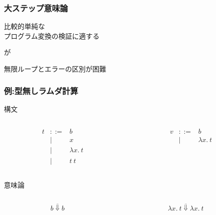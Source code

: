 \documentclass[dvipdfmx,cjk,xcolor=dvipsnames,envcountsect,notheorems,12pt]{beamer}
\theoremstyle{definition}
\begin{document}
\begin{frame}
	\frametitle{大ステップ意味論}
	\LARGE
	\begin{center}
	比較的単純な\\プログラム変換の検証に適する

	\vfill

	が

	\vfill

	無限ループとエラーの区別が困難
	\end{center}
\end{frame}

\begin{frame}
	\frametitle{例:型無しラムダ計算}
	\Large
	構文
	\begin{columns}
		\begin{column}{0.5\textwidth}
			\[
				\begin{array}{lcl}
					t & ::= & b \\
					  & | & x \\
						& | & \lambda x.~t \\
						& | & t~t
				\end{array}
			\]
		\end{column}
		\begin{column}{0.5\textwidth}
			\[
				\begin{array}{lcl}
					v & ::= & b \\
						& | & \lambda x.~t \\
				\end{array}
			\]
		\end{column}
	\end{columns}

	\vfill

	意味論
	\begin{columns}
		\begin{column}{0.5\textwidth}
			\[\overline{b \Downarrow b}\]
		\end{column}
		\begin{column}{0.5\textwidth}
			\[\overline{\lambda x.~t \Downarrow \lambda x.~t}\]
		\end{column}
	\end{columns}

	\begin{prooftree}
	\end{prooftree}
\end{frame}
\end{document}
